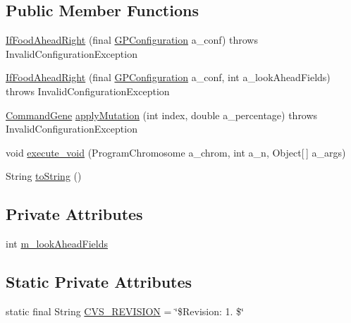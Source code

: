 \subsection*{Public Member Functions}
\begin{DoxyCompactItemize}
\item 
\hyperlink{classexamples_1_1gp_1_1anttrail_1_1_if_food_ahead_right_a07113ad0f8ec11fbc0867227a491e5a3}{If\-Food\-Ahead\-Right} (final \hyperlink{classorg_1_1jgap_1_1gp_1_1impl_1_1_g_p_configuration}{G\-P\-Configuration} a\-\_\-conf)  throws Invalid\-Configuration\-Exception 
\item 
\hyperlink{classexamples_1_1gp_1_1anttrail_1_1_if_food_ahead_right_ad898ae13497e55f651265f7a4a53fac4}{If\-Food\-Ahead\-Right} (final \hyperlink{classorg_1_1jgap_1_1gp_1_1impl_1_1_g_p_configuration}{G\-P\-Configuration} a\-\_\-conf, int a\-\_\-look\-Ahead\-Fields)  throws Invalid\-Configuration\-Exception 
\item 
\hyperlink{classorg_1_1jgap_1_1gp_1_1_command_gene}{Command\-Gene} \hyperlink{classexamples_1_1gp_1_1anttrail_1_1_if_food_ahead_right_af6a1ba82512aca773b80891a374ed439}{apply\-Mutation} (int index, double a\-\_\-percentage)  throws Invalid\-Configuration\-Exception 
\item 
void \hyperlink{classexamples_1_1gp_1_1anttrail_1_1_if_food_ahead_right_a2edb6b32bf448f789053207b2fbfa263}{execute\-\_\-void} (Program\-Chromosome a\-\_\-chrom, int a\-\_\-n, Object\mbox{[}$\,$\mbox{]} a\-\_\-args)
\item 
String \hyperlink{classexamples_1_1gp_1_1anttrail_1_1_if_food_ahead_right_a5fdc4d87574bd4547e40f0ed1c1023a1}{to\-String} ()
\end{DoxyCompactItemize}
\subsection*{Private Attributes}
\begin{DoxyCompactItemize}
\item 
int \hyperlink{classexamples_1_1gp_1_1anttrail_1_1_if_food_ahead_right_ae45e232ac44cd8a9ae235aaba5797b4f}{m\-\_\-look\-Ahead\-Fields}
\end{DoxyCompactItemize}
\subsection*{Static Private Attributes}
\begin{DoxyCompactItemize}
\item 
static final String \hyperlink{classexamples_1_1gp_1_1anttrail_1_1_if_food_ahead_right_a4da5a5dbfe1f33a0fd52874b42b3edde}{C\-V\-S\-\_\-\-R\-E\-V\-I\-S\-I\-O\-N} = \char`\"{}\$Revision\-: 1. \$\char`\"{}
\end{DoxyCompactItemize}
